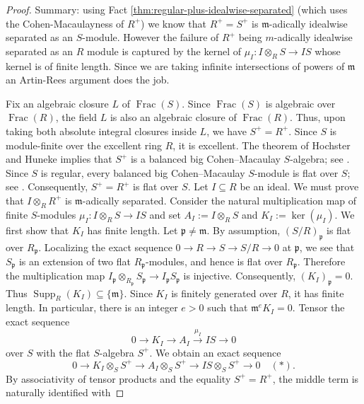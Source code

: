 \documentclass[12pt,reqno]{amsart}
\theoremstyle{definition}
\theoremstyle{remark}
\theoremstyle{cited}
\theoremstyle{remark}
\theoremstyle{citeddef}
\DeclareMathOperator{\Frac}{Frac}
\newcommand{\fm}{\mathfrak{m}}
\newcommand{\fp}{\mathfrak{p}}
\begin{document}
	\begin{proof}
		
		Summary: using Fact \ref{thm:regular-plus-idealwise-separated} (which uses the Cohen-Macaulayness of $R^{+}$) we know that $R^{+} = S^{+}$ is $\fm$-adically idealwise separated as an $S$-module. However the failure of $R^{+}$ being $m$-adically idealwise separated as an $R$ module is captured by the kernel of \(
		\mu_I\colon I\otimes_RS\to IS
		\) 
		whose kernel is of finite length. Since we are taking infinite intersections of powers of $\fm$ an Artin-Rees argument does the job.  
		
		Fix an algebraic closure $L$ of $\Frac(S)$. Since $\Frac(S)$ is algebraic
		over $\Frac(R)$, the field $L$ is also an algebraic closure of
		$\Frac(R)$. Thus, upon taking both absolute integral closures inside $L$,
		we have
		\(
		S^+=R^+.
		\)
		Since $S$ is module-finite over the excellent ring $R$, it is excellent. The
		theorem of Hochster and Huneke implies that $S^+$ is a balanced big
		Cohen--Macaulay $S$-algebra; see \cite{HH}. Since $S$ is regular, every balanced big Cohen--Macaulay $S$-module is
		flat over $S$; see \cite{Hoc83}. Consequently,
		$S^+=R^+$ is flat over $S$.
		Let $I\subseteq R$ be an ideal. We must prove that
		\(
		I\otimes_RR^+
		\)
		is $\fm$-adically separated. Consider the natural multiplication map of finite
		$S$-modules
		\(
		\mu_I\colon I\otimes_RS\to IS
		\)
		and set
		\(
		A_I:=I\otimes_RS\)
		{and} \(K_I:=\ker(\mu_I).\)
		We first show that $K_I$ has finite length. Let $\fp\neq\fm$. By assumption, $(S/R)_{\fp}$ is flat over $R_{\fp}$.
		Localizing the exact sequence
		\(
		0\to R\to S\to S/R\to 0
		\)
		at $\fp$, we see that $S_{\fp}$ is an extension of two flat
		$R_{\fp}$-modules, and hence is flat over $R_{\fp}$. Therefore the
		multiplication map
		\(
		I_{\fp}\otimes_{R_{\fp}}S_{\fp}
		\to
		I_{\fp}S_{\fp}
		\)
		is injective. Consequently,
		\(
		(K_I)_{\fp}=0.
		\)
		Thus
		\(
		\operatorname{Supp}_R(K_I)\subseteq\{\fm\}.
		\)
		Since $K_I$ is finitely generated over $R$, it has finite length. In
		particular, there is an integer $e>0$ such that
		\(
		\fm^eK_I=0.
		\)
		Tensor the exact sequence
		\[
		0\longrightarrow K_I\longrightarrow A_I
		\xrightarrow{\mu_I}IS\longrightarrow0
		\]
		over $S$ with the flat $S$-algebra $S^+$. We obtain an exact sequence
		\[
		0\longrightarrow K_I\otimes_SS^+
		\longrightarrow A_I\otimes_SS^+
		\longrightarrow IS\otimes_SS^+
		\longrightarrow0 \quad(\ast).
		\]
		By associativity of tensor products and the equality $S^+=R^+$, the middle
		term is naturally identified with

\end{proof}
\end{document}
